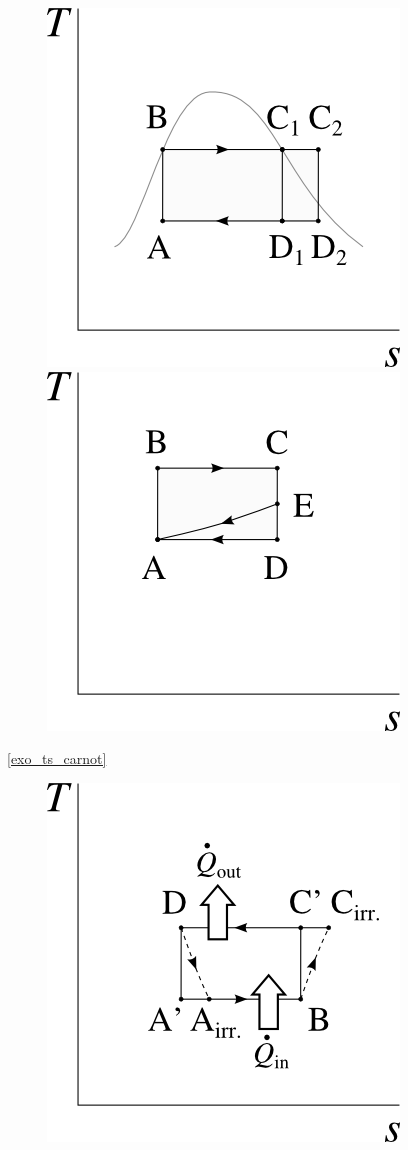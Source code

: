 \begin{description}
						\includegraphics[width=\solutiondiagramwidth]{images/exo_sol_ts_multiples5.png}
						\includegraphics[width=\solutiondiagramwidth]{images/exo_sol_ts_multiples6.png}
		\item [\ref{exo_ts_carnot}]
						\includegraphics[width=\solutiondiagramwidth]{images/exo_sol_ts_carnot_thermopompe.png}

\end{description}
